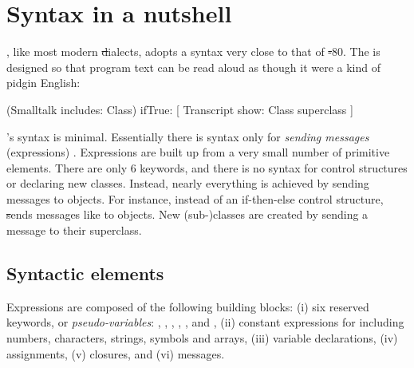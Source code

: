 \documentclass[a4paper,10pt,twoside]{book}
\begin{document}
	\renewcommand{\nnbb}[2]{} %
	\sloppy
\fi
\chapter{Syntax in a nutshell}
\label{cha:syntax}



\pharo, like most modern \st dialects, adopts a syntax very close to that of \st-80.
The  is designed so that program text can be read aloud as though it were a kind of pidgin English:

\begin{code}{}
(Smalltalk includes: Class) ifTrue: [ Transcript show: Class superclass ]
\end{code}

\noindent
\pharo's syntax is minimal.
Essentially there is syntax only for \emph{sending messages} (\ie expressions) .
Expressions are built up from a very small number of  primitive elements.
There are only 6 keywords, and there is no syntax for control structures or declaring new classes.
Instead, nearly everything is achieved by sending messages to objects.
For instance, instead of an if-then-else control structure, \st sends messages like  to  objects.
New \mbox{(sub-)classes} are created by sending a message to their superclass.

\section{Syntactic elements}

Expressions are composed of the following building blocks:
(i) six reserved keywords, or \emph{pseudo-variables}:
, , , , , and ,
(ii) constant expressions for  including numbers, characters, strings, symbols and arrays,
(iii) variable declarations,
(iv) assignments,
(v)  closures, and
(vi) messages.
\end{document}
